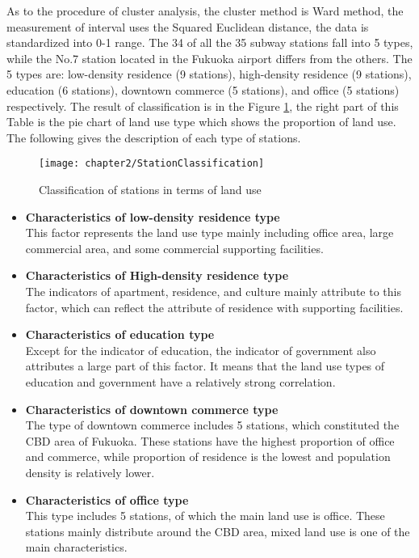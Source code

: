 %
As to the procedure of cluster analysis, the cluster method is Ward method, the measurement of interval uses the Squared Euclidean distance, the data is standardized into 0-1 range. The 34 of all the 35 subway stations fall into 5 types, while the No.7 station located in the Fukuoka airport differs from the others. The 5 types are: low-density residence (9 stations), high-density residence (9 stations), education (6 stations), downtown commerce (5 stations), and office (5 stations) respectively. The result of classification is in the Figure \ref{fig:chp2:StationClassification}, the right part of this Table is the pie chart of land use type which shows the proportion of land use. The following gives the description of each type of stations. 

%
\begin{figure}[htbp]
	\centering
	\texttt{[image: chapter2/StationClassification]}
	\caption{Classification of stations in terms of land use}
	\label{fig:chp2:StationClassification}
\end{figure}

%
\begin{itemize}
	\item \textbf{Characteristics of low-density residence type} \\
	This factor represents the land use type mainly including office area, large commercial area, and some commercial supporting facilities.
	
	\item \textbf{Characteristics of High-density residence type} \\
	The indicators of apartment, residence, and culture mainly attribute to this factor, which can reflect the attribute of residence with supporting facilities.
	
	\item \textbf{Characteristics of education type} \\
	Except for the indicator of education, the indicator of government also attributes a large part of this factor. It means that the land use types of education and government have a relatively strong correlation.
	
	\item \textbf{Characteristics of downtown commerce type} \\
	The type of downtown commerce includes 5 stations, which constituted the CBD area of Fukuoka. These stations have the highest proportion of office and commerce, while proportion of residence is the lowest and population density is relatively lower.
	
	\item \textbf{Characteristics of office type} \\
	This type includes 5 stations, of which the main land use is office. These stations mainly distribute around the CBD area, mixed land use is one of the main characteristics.
\end{itemize}


